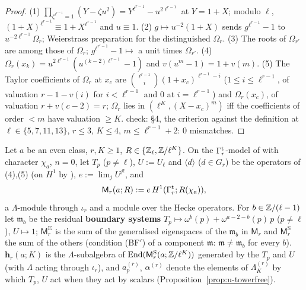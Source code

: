\documentclass[11pt]{article}
\newcommand{\Iw}{\Lambda}                         %
\newcommand{\hcusp}{\mathbf{h}}                   %
\newcommand{\Eis}{\mathrm{E}}
\newcommand{\cusp}{\mathrm{S}}
\newcommand{\Zl}{\Z_\ell}
\newcommand{\GaT}[1]{\Ga^{\mathrm t}_{#1}}            %
\newcommand{\Om}[1]{\Omega_{#1}}                      %
\newcommand{\IwT}[2]{\Iw^{(#2)}_{#1}}                 %
\begin{document}
\begin{proof}
(1) $\prod_{\zeta^{\ell^{r-1}}=1}(Y-\zeta u^{2})=Y^{\ell^{r-1}}-u^{2\ell^{r-1}}$ at $Y=1+X$; modulo $\ell$, $(1+X)^{\ell^{r-1}}\equiv1+X^{\ell^{r-1}}$ and $u\equiv1$. (2) $g\mapsto u^{-2}(1+X)$ sends
$g^{\ell^{r-1}}-1$ to $u^{-2\ell^{r-1}}\Om r$; Weierstrass preparation for the distinguished $\Om r$. (3) The roots of $\Om{r'}$ are among those of $\Om r$; $g^{\ell^{r'-1}}-1\mapsto$ a unit times
$\Om{r'}$. (4) $\Om r(x_k)=u^{2\ell^{r-1}}(u^{(k-2)\ell^{r-1}}-1)$ and $v(u^{m}-1)=1+v(m)$. (5) The Taylor coefficients of $\Om r$ at $x_c$ are $\binom{\ell^{r-1}}{i}(1+x_c)^{\ell^{r-1}-i}$ ($1\le
i\le\ell^{r-1}$, of valuation $r-1-v(i)$ for $i<\ell^{r-1}$ and $0$ at $i=\ell^{r-1}$) and $\Om r(x_c)$, of valuation $r+v(c-2)=r$; $\Om r$ lies in $(\ell^{K},(X-x_c)^{m})$ iff the
coefficients of order $<m$ have valuation $\ge K$. \COMP{} check:  \S4, the criterion against the definition at
$\ell\in\{5,7,11,13\}$, $r\le3$, $K\le4$, $m\le\ell^{r-1}+2$: $0$ mismatches.
\end{proof}

\begin{definition}\label{def:u-towerobj}
Let $a$ be an even class, $r,K\ge1$, $\cring\in\{\Zl,\Z/\ell^{K}\}$. On the $\GaT r$-model of  with character $\chi_a$, $n=0$, let $T_p$ ($p\ne\ell$), $U:=U_\ell$ and
$\langle d\rangle$ ($d\in G_r$) be the operators of (4),(5) (on $H^{1}$ by ), $e:=\lim_jU^{j!}$, and
\[
  \mathsf M_r(a;\cring):=e\,H^{1}(\GaT r;\cring(\chi_a)),
\]
a $\Iw$-module through $\iota_r$ and a module over the Hecke operators. For $b\in\mathbb{Z}/(\ell-1)$ let $\mathfrak m_b$ be the residual \textbf{boundary systems}
$T_p\mapsto\omega^{b}(p)+\omega^{a-2-b}(p)\,p$ ($p\ne\ell$), $U\mapsto1$; $\mathsf M^{\Eis}_r$ is the sum of the generalised eigenspaces of the $\mathfrak m_b$ in $\mathsf M_r$ and $\mathsf M^{\cusp}_r$
the sum of the others (condition (BF$'$) of a component $\mathfrak m$: $\mathfrak m\ne\mathfrak m_b$ for every $b$). $\hcusp_r(a;K)$ is the $\Iw$-subalgebra of $\End(\mathsf M^{\cusp}_r(a;\Z/\ell^{K}))$
generated by the $T_p$ and $U$ (with $\Iw$ acting through $\iota_r$), and $a^{(r)}_p$, $\alpha^{(r)}$ denote the elements of $\IwT Kr$ by which $T_p$, $U$ act when they act by scalars
(Proposition~\ref{prop:u-towerfree}).
\end{definition}
\end{document}
